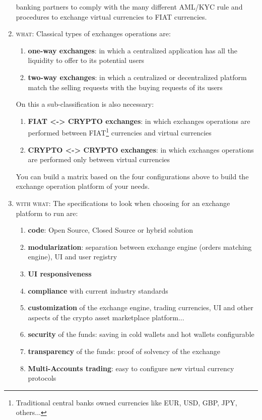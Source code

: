 \documentclass[11pt,fleqn,oneside]{book} %
\begin{document}
\begin{enumerate}
	banking partners to comply with the many different AML/KYC rule and procedures to exchange virtual currencies
	to FIAT currencies.
	\item \textsc{what}: Classical types of exchanges operations are: 
		\begin{enumerate}[label*=\arabic*.]
			\item \textbf{one-way exchanges}: in which a centralized application has all the liquidity to offer to its potential users
			\item \textbf{two-way exchanges}: in which a centralized or decentralized platform match the selling requests with the buying requests
			of its users
		\end{enumerate}
		On this a sub-classification is also necessary:
		\begin{enumerate}[label*=\arabic*.]
			\item \textbf{FIAT <-> CRYPTO exchanges}: in which exchanges operations are performed between FIAT\footnote{Traditional central banks owned currencies like EUR, USD, GBP, JPY, others...} 
			currencies and virtual currencies
			\item \textbf{CRYPTO <-> CRYPTO exchanges}: in which exchanges operations are performed only between virtual currencies
		\end{enumerate}
	You can build a matrix based on the four configurations above to build the exchange operation platform of your needs.
	\item \textsc{with what}: The specifications to look when choosing for an exchange platform to run are:
		\begin{enumerate}[label*=\arabic*.]
			\item \textbf{code}: Open Source, Closed Source or hybrid solution
			\item \textbf{modularization}: separation between exchange engine (orders matching engine), UI and user registry
			\item \textbf{UI responsiveness}
			\item \textbf{compliance} with current industry standards
			\item \textbf{customization} of the exchange engine, trading currencies, UI and other aspects of the crypto asset marketplace platform...
			\item \textbf{security} of the funds: saving in cold wallets and hot wallets configurable
			\item \textbf{transparency} of the funds: proof of solvency of the exchange
			\item \textbf{Multi-Accounts trading}: easy to configure new virtual currency protocols

\end{enumerate}
\end{enumerate}
\end{document}
